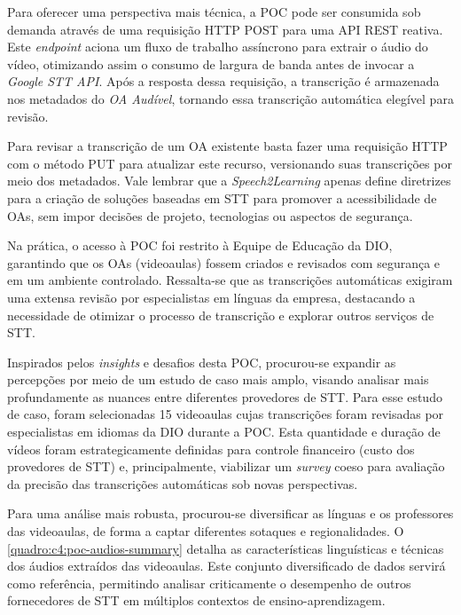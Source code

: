Para oferecer uma perspectiva mais técnica, a POC pode ser consumida sob demanda através de uma requisição HTTP POST para uma API REST reativa. Este \textit{endpoint} aciona um fluxo de trabalho assíncrono para extrair o áudio do vídeo, otimizando assim o consumo de largura de banda antes de invocar a \textit{Google STT API}. Após a resposta dessa requisição, a transcrição é armazenada nos metadados do \textit{OA Audível}, tornando essa transcrição automática elegível para revisão.

Para revisar a transcrição de um OA existente basta fazer uma requisição HTTP com o método PUT para atualizar este recurso, versionando suas transcrições por meio dos metadados. Vale lembrar que a \textit{Speech2Learning} apenas define diretrizes para a criação de soluções baseadas em STT para promover a acessibilidade de OAs, sem impor decisões de projeto, tecnologias ou aspectos de segurança.

Na prática, o acesso à POC foi restrito à Equipe de Educação da DIO, garantindo que os OAs (videoaulas) fossem criados e revisados com segurança e em um ambiente controlado. Ressalta-se que as transcrições automáticas exigiram uma extensa revisão por especialistas em línguas da empresa, destacando a necessidade de otimizar o processo de transcrição e explorar outros serviços de STT.

Inspirados pelos \textit{insights} e desafios desta POC, procurou-se expandir as percepções por meio de um estudo de caso mais amplo, visando analisar mais profundamente as nuances entre diferentes provedores de STT. Para esse estudo de caso, foram selecionadas 15 videoaulas cujas transcrições foram revisadas por especialistas em idiomas da DIO durante a POC. Esta quantidade e duração de vídeos foram estrategicamente definidas para controle financeiro (custo dos provedores de STT) e, principalmente, viabilizar um \textit{survey} coeso para avaliação da precisão das transcrições automáticas sob novas perspectivas.

Para uma análise mais robusta, procurou-se diversificar as línguas e os professores das videoaulas, de forma a captar diferentes sotaques e regionalidades. O \autoref{quadro:c4:poc-audios-summary} detalha as características linguísticas e técnicas dos áudios extraídos das videoaulas. Este conjunto diversificado de dados servirá como referência, permitindo analisar criticamente o desempenho de outros fornecedores de STT em múltiplos contextos de ensino-aprendizagem.

